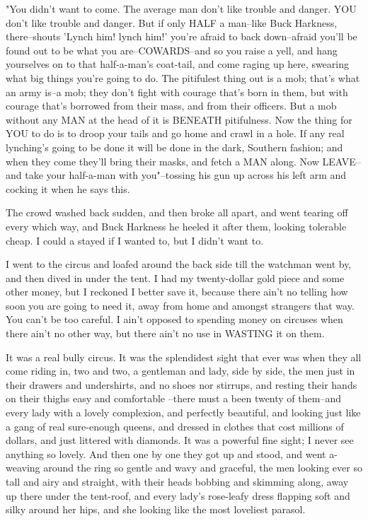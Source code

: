"You didn't want to come.  The average man don't like trouble and danger.
YOU don't like trouble and danger.  But if only HALF a man--like Buck
Harkness, there--shouts 'Lynch him! lynch him!' you're afraid to back
down--afraid you'll be found out to be what you are--COWARDS--and so
you raise a yell, and hang yourselves on to that half-a-man's coat-tail,
and come raging up here, swearing what big things you're going to do.
The pitifulest thing out is a mob; that's what an army is--a mob; they
don't fight with courage that's born in them, but with courage that's
borrowed from their mass, and from their officers.  But a mob without any
MAN at the head of it is BENEATH pitifulness.  Now the thing for YOU to
do is to droop your tails and go home and crawl in a hole.  If any real
lynching's going to be done it will be done in the dark, Southern
fashion; and when they come they'll bring their masks, and fetch a MAN
along.  Now LEAVE--and take your half-a-man with you"--tossing his gun up
across his left arm and cocking it when he says this.

The crowd washed back sudden, and then broke all apart, and went tearing
off every which way, and Buck Harkness he heeled it after them, looking
tolerable cheap.  I could a stayed if I wanted to, but I didn't want to.

I went to the circus and loafed around the back side till the watchman
went by, and then dived in under the tent.  I had my twenty-dollar gold
piece and some other money, but I reckoned I better save it, because
there ain't no telling how soon you are going to need it, away from home
and amongst strangers that way.  You can't be too careful.  I ain't
opposed to spending money on circuses when there ain't no other way, but
there ain't no use in WASTING it on them.

It was a real bully circus.  It was the splendidest sight that ever was
when they all come riding in, two and two, a gentleman and lady, side by
side, the men just in their drawers and undershirts, and no shoes nor
stirrups, and resting their hands on their thighs easy and comfortable
--there must a been twenty of them--and every lady with a lovely
complexion, and perfectly beautiful, and looking just like a gang of real
sure-enough queens, and dressed in clothes that cost millions of dollars,
and just littered with diamonds.  It was a powerful fine sight; I never
see anything so lovely.  And then one by one they got up and stood, and
went a-weaving around the ring so gentle and wavy and graceful, the men
looking ever so tall and airy and straight, with their heads bobbing and
skimming along, away up there under the tent-roof, and every lady's
rose-leafy dress flapping soft and silky around her hips, and she looking
like the most loveliest parasol.

